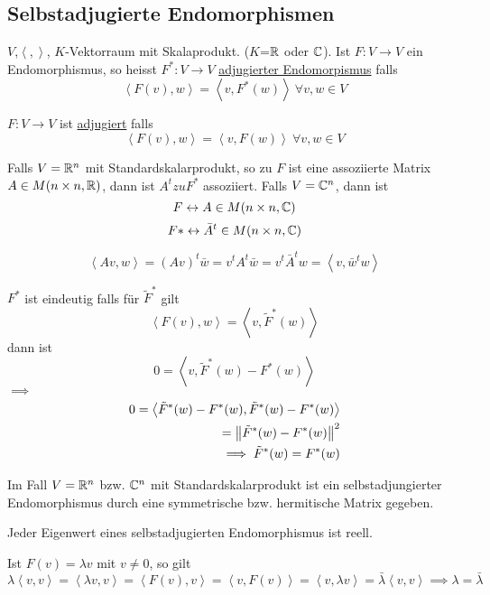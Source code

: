\subsection{Selbstadjugierte Endomorphismen}
$V$,$\left\langle , \right\rangle$, $K$-Vektorraum mit Skalaprodukt. ($K$=$\mathbb{R}$ oder $\mathbb{C}$). Ist $F:V\to V$ ein Endomorphismus, so heisst $F^*:V\to V$ \underline{adjugierter Endomorpismus} falls 
\[\left\langle F(v),w \right\rangle = \left\langle v,F^*(w) \right\rangle\ \forall v,w\in V\]
\begin{Def}
  $F:V\to V$ ist \underline{adjugiert} falls
  \[\left\langle F(v),w \right\rangle=\left\langle v,F(w) \right\rangle\ \forall v,w\in V\]
\end{Def}
\begin{Eig}
  Falls $V=\mathbb{R}^n$ mit Standardskalarprodukt, so zu $F$ ist eine assoziierte Matrix $A\in M(n\times n,\mathbb{R})$, dann ist $A^t zu F^*$ assoziiert.
  Falls $V=\mathbb{C}^n$, dann ist 
  \[F\leftrightarrow A\in M(n\times n,\mathbb{C})\]
  \[F*\leftrightarrow \bar{A}^t\in M(n\times n,\mathbb{C})\]
\end{Eig}
\begin{Bew}
  \[\left\langle Av,w \right\rangle=(Av)^t\bar{w}=v^tA^t\bar{w}=v^t\bar{A}^tw=\left\langle v,\bar{w}^tw \right\rangle\]
\end{Bew}
\begin{Bem}
  $F^*$ ist eindeutig falls für $\tilde F^*$ gilt
  \[\left\langle F(v),w \right\rangle=\left\langle v,\tilde F^*(w) \right\rangle\]
  dann ist
  \[0=\left\langle v,\tilde F^*(w)-F^*(w) \right\rangle\]
  $\implies$
  \begin{align*}
    0=\left\langle \tilde F^*(w)-F^*(w),\tilde F^*(w)-F^*(w) \right\rangle\\
    =\left\| \tilde F^*(w)-F^*(w) \right\|^2\\
    \implies \tilde F^*(w)=F^*(w)
  \end{align*}
\end{Bem}
\begin{Faz}
  Im Fall $V=\mathbb{R}^n$ bzw. $\mathbb{C}^n$ mit Standardskalarprodukt ist ein selbstadjungierter Endomorphismus durch eine symmetrische bzw. hermitische Matrix gegeben.
\end{Faz}
\begin{Lem}
  Jeder Eigenwert eines selbstadjugierten Endomorphismus ist reell.
\end{Lem}
\begin{Bew}
  Ist $F(v)=\lambda v$ mit $v\neq 0$, so gilt
  \[\lambda\left\langle v,v \right\rangle=\left\langle \lambda v,v \right\rangle=\left\langle F(v),v \right\rangle=\left\langle v,F(v) \right\rangle=\left\langle v,\lambda v \right\rangle=\bar \lambda\left\langle v,v \right\rangle \implies \lambda=\bar\lambda \]
\end{Bew}

